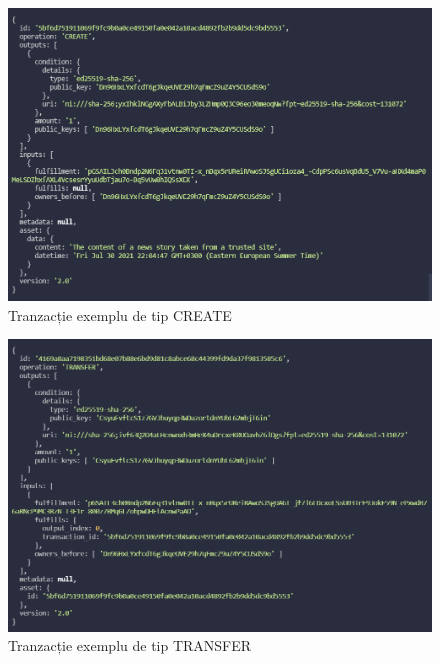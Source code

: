 \clearpage

\begin{figure}[H]
\centering
\includegraphics[scale=0.6]{Images/BCDB_Create_Transaction.png}
\caption{Tranzacție exemplu de tip CREATE}
\end{figure}

\begin{figure}[H] 
\centering
\includegraphics[scale=0.6]{Images/BCDB_Transfer_Transaction.png}
\caption{Tranzacție exemplu de tip TRANSFER}
\end{figure}
